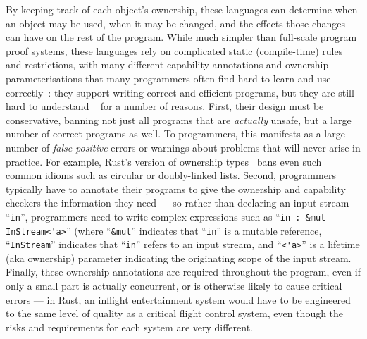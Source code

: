 By keeping track of each object's
ownership, these languages can determine when an object may be used,
when it may be changed, and the effects those changes can have on the
rest of the program.
%
%
%
%
While much simpler than full-scale program proof systems, these 
languages rely on complicated static (compile-time) rules and
restrictions, with many different capability annotations and ownership
parameterisations that many programmers often find hard to learn and use
correctly~\cite{LearnRust,VizRust,HardRust}: they support writing
correct and efficient programs, but they are still hard to understand
~\cite{SafeRust,FightRust} for a number of
reasons. First, their design must be conservative, banning not just
all  programs that are \textit{actually} unsafe, but a large
number of correct programs as well.  To programmers, this
manifests as a large number of \textit{false positive} errors or
warnings about problems that will never arise in practice.  For
example, Rust's version of ownership types~\cite{RustBook} bans even
such common idioms such as circular or doubly-linked lists.  Second,
programmers typically have to annotate their programs to give the
ownership and capability checkers the information they need --- so
rather than declaring an input stream ``\verb+in+'', programmers need
to write complex expressions such as ``\verb+in : &mut InStream<'a>+''
(where ``\verb+&mut+'' indicates that ``\verb+in+'' is a mutable
reference, ``\verb+InStream+'' indicates that ``\verb+in+'' refers to
an input stream, and  ``\verb+<'a>+'' is a lifetime (aka ownership)
parameter indicating the originating scope of the input stream.
Finally, these ownership annotations are required throughout
the program,  even if only a small part is actually concurrent, or is
otherwise likely to cause critical errors --- in Rust, an inflight
entertainment system would have to be engineered to the same level of
quality as a critical flight control system, even though the risks and
requirements for each system are very different.


